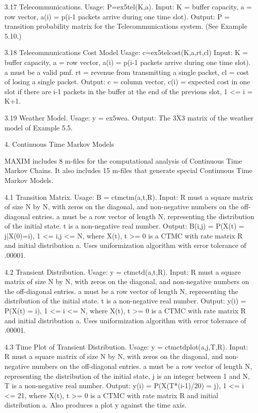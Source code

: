 3.17 Telecommunications.
Usage:  P=ex5tel(K,a).
Input: K = buffer capacity,
a = row vector, a(i) =  p(i-1 packets arrive during one time slot).
Output: P = transition  probability matrix for the Telecommunications system. (See  Example 5.10.)

3.18 Telecommunications Cost Model
Usage:  c=ex5telcost(K,a,rt,cl)
Input: K = buffer capacity,
a = row vector, a(i) =  p(i-1 packets arrive during one time slot). a must be a valid pmf.
rt =  revenue from transmitting a single packet,
cl =  cost of losing a single packet.
Output: c = column vector, c(i) =  expected cost in one slot if there are i-1 packets in the buffer at the end of the previous slot, 1 <= i \<= K+1.

3.19 Weather Model.
Usage:  y = ex5wea.
Output: The 3X3 matrix of the weather model of Example 5.5. 


4. Continuous Time Markov Models


MAXIM includes 8 m-files for the computational analysis of Continuous Time Markov Chains. It also includes 15 m-files that generate special Continuous Time Markov Models.


4.1 Transition Matrix.
Usage:  B = ctmctm(a,t,R).
Input: R must a square matrix of size N by N, with zeros on the diagonal, and non-negative numbers on the off-diagonal entries. a must be  a row vector of length N, representing the distribution of the initial state. t is a non-negative real number.  
Output: B(i,j) = P(X(t) = j|X(0)=i),  1 <= i,j <= N, where {X(t), t >= 0} is a CTMC with rate matrix R and initial distribution a. Uses uniformization algorithm with error tolerance of .00001.

4.2 Transient Distribution.
Usage:  y = ctmctd(a,t,R).
Input: R must a square matrix of size N by N, with zeros on the diagonal, and non-negative numbers on the off-diagonal entries. a must be  a row vector of length N, representing the distribution of the initial state. t is a non-negative real number.  
Output: y(i) = P(X(t) = i),  1 <= i <= N, where {X(t), t >= 0} is a CTMC with rate matrix R and initial distribution a. Uses uniformization algorithm with error tolerance of .00001.

4.3 Time Plot of Transient Distribution.
Usage:  y = ctmctdplot(a,j,T,R).
Input: R must a square matrix of size N by N, with zeros on the diagonal, and non-negative numbers on the off-diagonal entries. a must be  a row vector of length N, representing the distribution of the initial state, j is an integer between 1 and N, T is a non-negative real number. 
Output: y(i) = P(X(T*(i-1)/20) = j),  1 <= i <= 21, where {X(t), t >= 0} is a CTMC with rate matrix R and initial distribution a. Also produces a plot y against the time axis.

